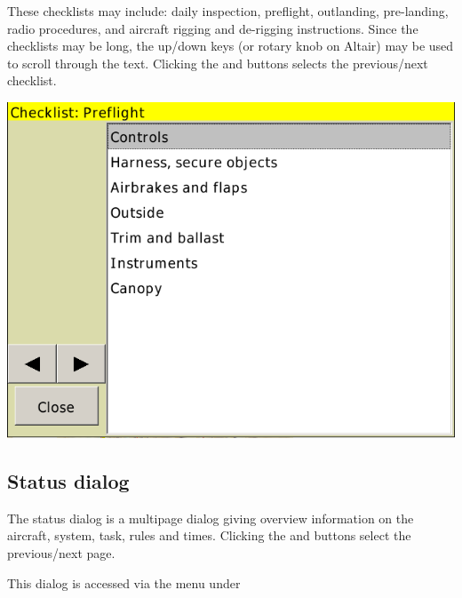 \documentclass[a4paper,12pt]{refrep}
\begin{document}
These checklists may include: daily inspection, preflight, outlanding,
pre-landing, radio procedures, and aircraft rigging and de-rigging
instructions.  Since the checklists may be long, the up/down keys (or rotary
knob on Altair) may be used to scroll through the text. Clicking the
\button{$<$} and \button{$>$} buttons selects the previous/next checklist.

\begin{center}
\includegraphics[angle=0,width=\linewidth,keepaspectratio='true']{figures/checklist.png}
\end{center}

\subsection*{Status dialog}
The status dialog is a multipage dialog giving overview information on the 
aircraft, system, task, rules and times. Clicking the \button{$<$} and
\button{$>$} buttons select the previous/next page.

This dialog is accessed via the menu under 
\begin{quote}
\blink{}
\end{quote}
\end{document}
